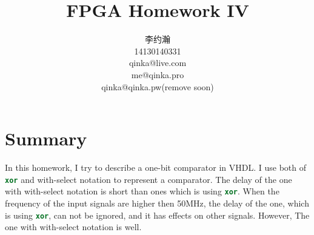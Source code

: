 \documentclass{article}
\title{FPGA Homework IV}
\author{李约瀚 \\ 14130140331 \\ qinka@live.com \\ me@qinka.pro \\ qinka@qinka.pw(remove soon)}
\begin{document}
    \maketitle
    \newpage
    \tableofcontents
    \newpage
    \section{Summary}
    \label{sec:summary}
    
    In this homework, I try to describe a one-bit comparator in VHDL.
    I use both of \lstinline[language=VHDL]|xor| and with-select notation to represent a comparator. 
    The delay of the one with with-select notation is short than ones which is using \lstinline[language=VHDL]|xor|. When the frequency of the input signals  are higher then 50MHz,
    the delay of the one, which is using \lstinline[language=VHDL]|xor|, can not be ignored,
    and it has effects on other signals. However, The one with with-select notation is well.
    
    
\end{document}
